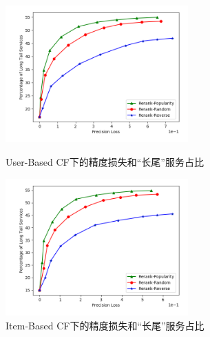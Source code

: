 \documentclass[master,winfonts]{njuthesis}
\begin{document}
\begin{figure}[htbp]
\centering
\begin{minipage}[t]{0.48\textwidth}
\centering
\includegraphics[width=7cm]{diversity_5.png}
\caption{User-Based CF下的精度损失和“长尾”服务占比}\label{lab-13}
\end{minipage}
\begin{minipage}[t]{0.48\textwidth}
\centering
\includegraphics[width=7cm]{diversity_6.png}
\caption{Item-Based CF下的精度损失和“长尾”服务占比}\label{lab-14}
\end{minipage}
\end{figure}
\end{document}
